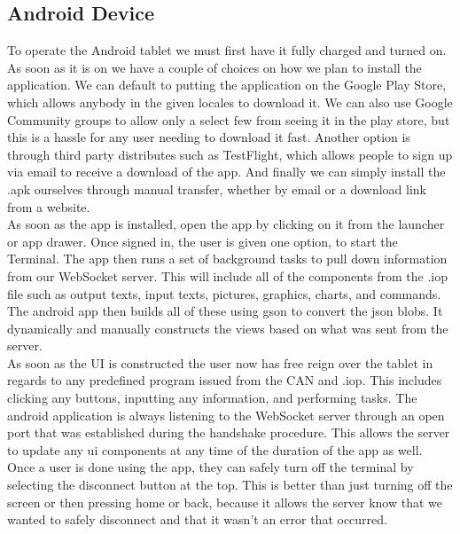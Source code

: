 \documentclass[paper=a4, fontsize=11pt]{scrartcl}
\numberwithin{equation}{section}		%
\numberwithin{figure}{section}			%
\numberwithin{table}{section}				%
\begin{document}
 \subsection{Android Device} 
 To operate the Android tablet we must first have it fully charged and turned on. As soon as it is on we have a couple of choices on how we plan to install the application. We can default to putting the application on the Google Play Store, which allows anybody in the given locales to download it. We can also use Google Community groups to allow only a select few from seeing it in the play store, but this is a hassle for any user needing to download it fast. Another option is through third party distributes such as TestFlight, which allows people to sign up via email to receive a download of the app. And finally we can simply install the .apk ourselves through manual transfer, whether by email or a download link from a website. \\

 As soon as the app is installed, open the app by clicking on it from the launcher or app drawer. Once signed in, the user is given one option, to start the Terminal. The app then runs a set of background tasks to pull down information from our WebSocket server. This will include all of the components from the .iop file such as output texts, input texts, pictures, graphics, charts, and commands. The android app then builds all of these using gson to convert the json blobs. It dynamically and manually constructs the views based on what was sent from the server. \\

 As soon as the UI is constructed the user now has free reign over the tablet in regards to any predefined program issued from the CAN and .iop. This includes clicking any buttons, inputting any information, and performing tasks. The android application is always listening to the WebSocket server through an open port that was established during the handshake procedure. This allows the server to update any ui components at any time of the duration of the app as well. \\

 Once a user is done using the app, they can safely turn off the terminal by selecting the disconnect button at the top. This is better than just turning off the screen or then pressing home or back, because it allows the server know that we wanted to safely disconnect and that it wasn't an error that occurred. \\
\end{document}
